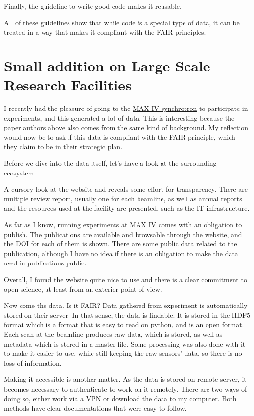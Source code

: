 \documentclass{article}
\begin{document}
Finally, the guideline to write good code makes it reusable. 

All of these guidelines show that while code is a special type of data, it can be treated in a way that makes it compliant with the FAIR principles.

\section{Small addition on Large Scale Research Facilities}

I recently had the pleasure of going to the \href{https://www.maxiv.lu.se/}{MAX IV synchrotron}  to participate in experiments, and this generated a lot of data. This is interesting because the paper authors above also comes from the same kind of background. My reflection would now be to ask if this data is compliant with the FAIR principle, which they claim to be in their strategic plan. 

Before we dive into the data itself, let's have a look at the surrounding ecosystem.

A cursory look at the website and reveals some effort for transparency. There are multiple review report, usually one for each beamline, as well as annual reports and the resources used at the facility are presented, such as the IT infrastructure. 

As far as I know, running experiments at MAX IV comes with an obligation to publish. The publications are available and browsable through the website, and the DOI for each of them is shown. There are some public data related to the publication, although I have no idea if there is an obligation to make the data used in publications public.

Overall, I found the website quite nice to use and there is a clear commitment to open science, at least from an exterior point of view.

Now come the data. Is it FAIR? Data gathered from experiment is automatically stored on their server. In that sense, the data is findable. It is stored in the HDF5 format which is a format that is easy to read on python, and is an open format. Each scan at the beamline produces raw data, which is stored, as well as metadata which is stored in a master file. Some processing was also done with it to make it easier to use, while still keeping the raw sensors' data, so there is no loss of information. 

Making it accessible is another matter. As the data is stored on remote server, it becomes necessary to authenticate to work on it remotely. There are two ways of doing so, either work via a VPN or download the data to my computer. Both methods have clear documentations that were easy to follow. 
\end{document}
